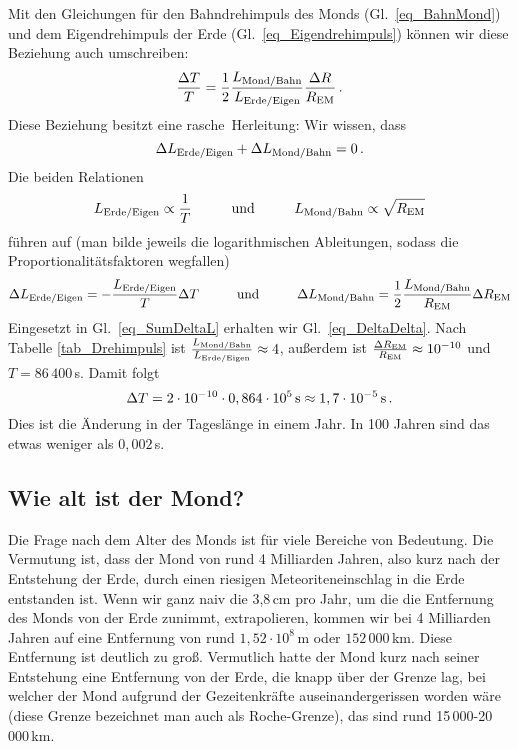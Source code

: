 Mit den Gleichungen f\"ur den Bahndrehimpuls des Monds (Gl.\ \ref{eq_BahnMond}) und dem Eigendrehimpuls
der Erde (Gl.\ \ref{eq_Eigendrehimpuls}) k\"onnen wir diese Beziehung auch umschreiben:
\begin{equation}
\label{eq_DeltaDelta}
      \frac{ \Delta T}{T}  = \frac{1}{2}  
                \frac{L_{\rm Mond/Bahn}}{L_{\rm Erde/Eigen}} \frac{\Delta R}{R_{\rm EM}} \, .
\end{equation}
Diese Beziehung besitzt eine \glqq rasche\grqq\ Herleitung: Wir wissen, dass
\begin{equation}
\label{eq_SumDeltaL}
                \Delta L_{\rm Erde/Eigen} + \Delta L_{\rm Mond/Bahn} = 0  \, .
\end{equation}
Die beiden Relationen
\begin{equation}
       L_{\rm Erde/Eigen} \propto \frac{1}{T}  \hspace{1cm} {\rm und} \hspace{1cm}  
       L_{\rm Mond/Bahn} \propto  \sqrt{R_{\rm EM}}  
\end{equation}
f\"uhren auf (man bilde jeweils die logarithmischen Ableitungen, sodass die Proportionalit\"atsfaktoren wegfallen)
\begin{equation}
       \Delta L_{\rm Erde/Eigen} = - \frac{L_{\rm Erde/Eigen}}{T} \Delta T   \hspace{1cm} {\rm und} \hspace{1cm}  
       \Delta L_{\rm Mond/Bahn} =  \frac{1}{2} \frac{L_{\rm Mond/Bahn}}{R_{\rm EM}} \Delta R_{\rm EM} 
\end{equation}
Eingesetzt in Gl.\ \ref{eq_SumDeltaL} erhalten wir Gl.\ \ref{eq_DeltaDelta}. Nach Tabelle \ref{tab_Drehimpuls}
ist $\frac{L_{\rm Mond/Bahn}}{L_{\rm Erde/Eigen}} \approx 4$, au\ss erdem ist $\frac{\Delta R_{\rm EM}}{R_{\rm EM}}
\approx 10^{-10}$ und $T=86\,400$\,s. Damit folgt
\begin{equation}
             \Delta T =  2 \cdot 10^{-10} \cdot 0,864 \cdot 10^5\,{\rm s} \approx 1,7 \cdot 10^{-5} \,{\rm s} \, .  
\end{equation}
Dies ist die \"Anderung in der Tagesl\"ange in einem Jahr. In 100 Jahren sind das etwas weniger als
$0,002$\,s. 

\subsection{Wie alt ist der Mond?}

Die Frage nach dem Alter des Monds ist f\"ur viele Bereiche von Bedeutung. 
Die Vermutung
ist, dass der Mond von rund 4 Milliarden Jahren, also kurz nach der Entstehung der Erde, durch
einen riesigen Meteoriteneinschlag in die Erde entstanden ist. Wenn wir ganz naiv die 3,8\,cm 
pro Jahr, um die die Entfernung des Monds von der Erde zunimmt, extrapolieren, kommen wir
bei 4 Milliarden Jahren auf eine Entfernung von rund $1,52 \cdot 10^8$\,m oder $152\,000$\,km. 
Diese Entfernung ist deutlich zu gro\ss. Vermutlich hatte der Mond kurz nach seiner Entstehung
eine Entfernung von der Erde, die knapp \"uber der Grenze lag, bei welcher der Mond aufgrund
der Gezeitenkr\"afte auseinandergerissen worden w\"are (diese Grenze bezeichnet man auch als
Roche-Grenze), das sind rund 15\,000-20\,000\,km. 

